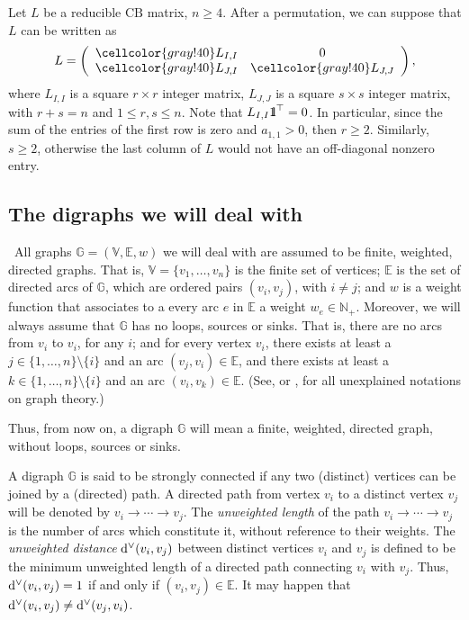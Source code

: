 \documentclass[ALCO]{cedram}
\newcommand{\y}{\cellcolor{gray!40}}
\newcommand{\mbn}{\mbox{$\mathbb{N}$}}
\newcommand{\mbg}{\mbox{$\mathbb{G}$}}
\newcommand{\mbv}{\mbox{$\mathbb{V}$}}
\newcommand{\mbe}{\mbox{$\mathbb{E}$}}
\newcommand{\mbone}{\mbox{$1\mkern-4.6mu {\rm l}$}}
\newcommand{\cb}{\mbox{$\mathrm{CB}$}}
\newcommand{\ud}{\mbox{${\rm d}^\vee$}}
\begin{document}
\begin{remark}\label{remarkreducedform}
Let $L$ be a reducible $\cb$ matrix, $n\geq 4$. After a permutation,
we can suppose that $L$ can be written as
\begin{eqnarray}\label{eqreducedform}
L=\left(\begin{array}{cc} 
\y L_{I,I}&0\\
\y L_{J,I}&\y L_{J,J}
\end{array}\right),
\end{eqnarray}
where $L_{I,I}$ is a square $r\times r$ integer matrix, $L_{J,J}$ is a
square $s\times s$ integer matrix, with $r+s=n$ and $1\leq r,s\leq n$.
Note that $L_{I,I}\mbone^{\top}=0$. In particular, since the sum of
the entries of the first row is zero and $a_{1,1}>0$, then $r\geq
2$. Similarly, $s\geq 2$, otherwise the last column of $L$ would not
have an off-diagonal nonzero entry.
\end{remark}

\subsection{The digraphs we will deal with}

\ All graphs $\mbg=(\mbv,\mbe,w)$ we will deal with are
assumed to be finite, weighted, directed graphs. That is,
$\mbv=\{v_1,\ldots ,v_n\}$ is the finite set of vertices; $\mbe$ is
the set of directed arcs of $\mbg$, which are ordered pairs
$(v_i,v_j)$, with $i\neq j$; and $w$ is a weight function that
associates to a every arc $e$ in $\mbe$ a weight
$w_e\in\mbn_+$. Moreover, we will always assume that $\mbg$ has no
loops, sources or sinks. That is, there are no arcs from $v_i$ to
$v_i$, for any $i$; and for every vertex $v_i$, there exists at least
a $j\in\{1,\ldots,n\}\setminus\{i\}$ and an arc $(v_j,v_i)\in \mbe$,
and there exists at least a $k\in\{1,\ldots,n\}\setminus\{i\}$ and an
arc $(v_i,v_k)\in \mbe$.  (See, \eg \cite{br} or \cite{gr}, for all
unexplained notations on graph theory.)

\begin{assumption}\label{digraph}
Thus, from now on, a digraph $\mbg$ will mean a finite, weighted,
directed graph, without loops, sources or sinks.
\end{assumption}

A digraph $\mbg$ is said to be strongly connected if any two
(distinct) vertices can be joined by a (directed) path. A directed
path from vertex $v_i$ to a distinct vertex $v_j$ will be denoted by
$v_i\to\cdots\to v_j$. The {\em unweighted length} of the path
$v_i\to\cdots\to v_j$ is the number of arcs which constitute it,
without reference to their weights.  The {\em unweighted distance}
$\ud(v_i,v_j)$ between distinct vertices $v_i$ and $v_j$ is defined to
be the minimum unweighted length of a directed path connecting $v_i$
with $v_j$. Thus, $\ud(v_i,v_j)=1$ if and only if $(v_i,v_j)\in\mbe$.
It may happen that $\ud(v_i,v_j)\neq \ud(v_j,v_i)$.
\end{document}
